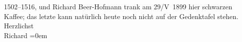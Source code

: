 \begin{ledgroupsized}[t]{13cm}
                  1502–1516, und Richard Beer-Hofmann trank am
                  29/V 1899 hier schwarzen Kaffee; das letzte kann natürlich heute noch
               nicht auf der Gedenktafel stehen.\pend
           \pstart
           Herzlichst{\\[\baselineskip]}\spacefill\mbox{Richard}\pend
           \leftskip=0em{}
         
         \endnumbering{}\end{ledgroupsized}  \newcommand{\dateiname}{L00919}\newcommand{\titel}{Richard Beer-Hofmann an Arthur Schnitzler, 29. 5. 1899}\newcommand{\editorInnen}{Martin Anton Müller und Gerd-Hermann Susen}
      